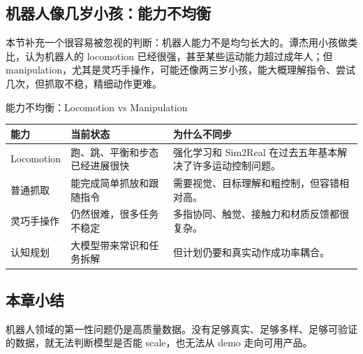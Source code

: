 \subsection{机器人像几岁小孩：能力不均衡}

本节补充一个很容易被忽视的判断：机器人能力不是均匀长大的。谭杰用小孩做类比，认为机器人的 locomotion 已经很强，甚至某些运动能力超过成年人；但 manipulation，尤其是灵巧手操作，可能还像两三岁小孩，能大概理解指令、尝试几次，但抓取不稳，精细动作更难。

\begin{knowledgebox}{能力不均衡：Locomotion vs Manipulation}
\begin{tabularx}{\textwidth}{p{}p{}X}
\toprule
能力 & 当前状态 & 为什么不同步 \\
\midrule
Locomotion & 跑、跳、平衡和步态已经进展很快 & 强化学习和 Sim2Real 在过去五年基本解决了许多运动控制问题。 \\
普通抓取 & 能完成简单抓放和跟随指令 & 需要视觉、目标理解和粗控制，但容错相对高。 \\
灵巧手操作 & 仍然很难，很多任务不稳定 & 多指协同、触觉、接触力和材质反馈都很复杂。 \\
认知规划 & 大模型带来常识和任务拆解 & 但计划仍要和真实动作成功率耦合。 \\
\bottomrule
\end{tabularx}
\end{knowledgebox}

\subsection{本章小结}

机器人领域的第一性问题仍是高质量数据。没有足够真实、足够多样、足够可验证的数据，就无法判断模型是否能 scale，也无法从 demo 走向可用产品。

